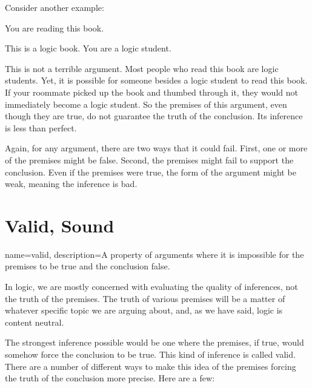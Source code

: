 Consider another example:

\begin{earg*}
\item You are reading this book.
\item This is a logic book.
\itemc[.3] You are a logic student.
\end{earg*}

This is not a terrible argument. Most people who read this book are logic students. Yet, it is possible for someone besides a logic student to read this book. If your roommate picked up the book and thumbed through it, they would not immediately become a logic student. So the premises of this argument, even though they are true, do not guarantee the truth of the conclusion. Its inference is less than perfect.

Again, for any argument, there are two ways that it could fail. First, one or more of the premises might be false.  Second, the premises might fail to support the conclusion. Even if the premises were true, the form of the argument might be weak, meaning the inference is bad.



\section{Valid, Sound}

{
name=valid,
description={A property of arguments where it is impossible for the premises to be true and the conclusion false.}
}

In logic, we are mostly concerned with evaluating the quality of inferences, not the truth of the premises. The truth of various premises will be a matter of whatever specific topic we are arguing about, and, as we have said, logic is content neutral.

The strongest inference possible would be one where the premises, if true, would somehow force the conclusion to be true. This kind of inference is called valid. There are a number of different ways to make this idea of the premises forcing the truth of the conclusion more precise. Here are a few:

